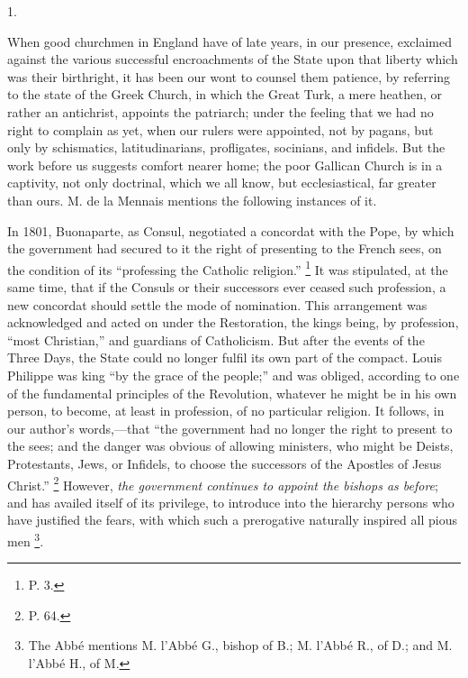 1.

When good churchmen in England have of late
years, in our presence, exclaimed against the various successful
encroachments of the State upon that liberty which was their
birthright, it has been our wont to counsel them patience, by
referring to the state of the Greek Church, in which the Great Turk, a
mere heathen, or rather an antichrist, appoints the patriarch; under
the feeling that we had no right to complain as yet, when our rulers
were appointed, not by pagans, but only by schismatics,
latitudinarians, profligates, socinians, and infidels. But the work
before us suggests comfort nearer home; the poor Gallican Church is in
a captivity, not only doctrinal, which we all know, but
ecclesiastical, far greater than ours. M. de la Mennais mentions the
following instances of it.

In 1801, Buonaparte, as Consul, negotiated a
concordat with the Pope, by which the government had secured to it the
right of presenting to the French sees, on the condition of its ``professing
the Catholic religion.'' \footnote{P. 3.}
It was stipulated, at the same time, that if the Consuls or their
successors ever ceased such profession, a new concordat should settle
the mode of nomination. This arrangement was acknowledged and acted on
under the Restoration, the kings being, by profession, ``most
Christian,'' and guardians of Catholicism. But after the events of the
Three Days, the State could no longer fulfil its own part of the
compact. Louis Philippe was king ``by the grace of the people;'' and was
obliged, according to one of the fundamental principles of the
Revolution, whatever he might be in his own person, to become, at
least in profession, of no particular religion. It follows, in our
author's words,—that ``the government had no longer the right
to present to the sees; and the danger was obvious of allowing
ministers, who might be Deists, Protestants, Jews, or Infidels, to
choose the successors of the Apostles of Jesus Christ.'' \footnote{P. 64.} However, \emph{the government continues to appoint the bishops as
before}; and has availed itself of its privilege, to introduce into the
hierarchy persons who have justified the fears, with which such a
prerogative naturally inspired all pious men \footnote{The Abbé mentions M. l'Abbé G., bishop of B.; M. l'Abbé R., of D.;
and M. l'Abbé H., of M.}.


